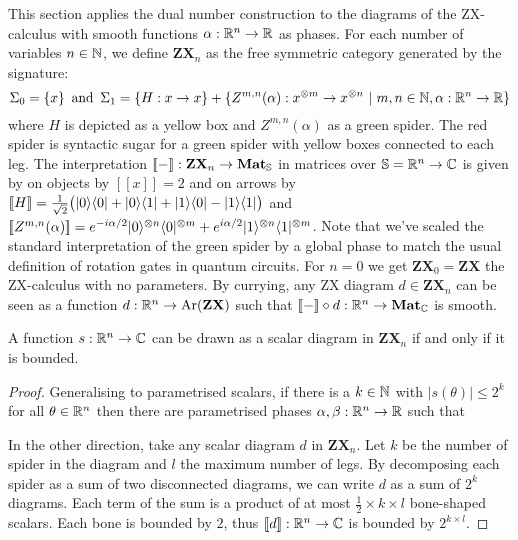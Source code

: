 This section applies the dual number construction to the diagrams of the ZX-calculus with smooth functions $\alpha : \R^n \to \R$ as phases.
For each number of variables $n \in \N$, we define $\mathbf{ZX}_n$ as the free symmetric category generated by the signature:
$$\Sigma_0 = \{ x \} \s \text{and} \s \Sigma_1 = \{ H : x \to x \} + \{ Z^{m, n}(\alpha) : x^{\otimes m} \to x^{\otimes n} \ \vert \ m, n \in \N, \alpha : \R^n \to \R \}$$
where $H$ is depicted as a yellow box and $Z^{m, n}(\alpha)$ as a green spider.
The red spider is syntactic sugar for a green spider with yellow boxes connected to each leg.
The interpretation $[\![-]\!]  : \mathbf{ZX}_n \to \mathbf{Mat}_\S$ in matrices over $\S = \R^n \to \C$ is given by on objects by $[\![ x ]\!] = 2$ and on arrows by
$[\![ H ]\!] = \frac{1}{\sqrt{2}} \big(\ket{0}\bra{0} + \ket{0}\bra{1} + \ket{1}\bra{0} - \ket{1}\bra{1}\big)$
and $[\![Z^{m, n}(\alpha)]\!] =
e^{-i \alpha / 2} \ket{0}^{\otimes n} \bra{0}^{\otimes m}
+ e^{i \alpha / 2} \ket{1}^{\otimes n} \bra{1}^{\otimes m}$.
Note that we've scaled the standard interpretation of the green spider by a global phase to match the usual definition of rotation gates in quantum circuits.
For $n = 0$ we get $\mathbf{ZX}_0 = \mathbf{ZX}$ the ZX-calculus with no parameters.
By currying, any ZX diagram $d \in \mathbf{ZX}_n$ can be seen as a function $d : \R^n \to \text{Ar}(\mathbf{ZX})$ such that $[\![-]\!] \circ d : \R^n \to \mathbf{Mat}_\C$ is smooth.

\begin{lemma}\label{lemma-scalars}
A function $s : \R^n \to \C$ can be drawn as a scalar diagram in $\mathbf{ZX}_n$ if and only if it is bounded.
\end{lemma}

\begin{proof}
Generalising \cite[P.~8.101]{CoeckeKissinger17} to parametrised scalars, if there is a $k \in \N$ with $\vert s(\theta) \vert \leq 2^k$ for all $\theta \in \R^n$ then there are parametrised phases $\alpha, \beta : \R^n \to \R$ such that


In the other direction, take any scalar diagram $d$ in $\mathbf{ZX}_n$.
Let $k$ be the number of spider in the diagram and $l$ the maximum number
of legs. By decomposing each spider as a sum of two disconnected diagrams,
we can write $d$ as a sum of $2^k$ diagrams. Each term of the sum is a product
of at most $\frac{1}{2} \times k \times l$ bone-shaped scalars. Each bone is
bounded by $2$, thus $[\![d]\!] : \R^n \to \C$ is bounded by $2^{k \times l}$.
\end{proof}

